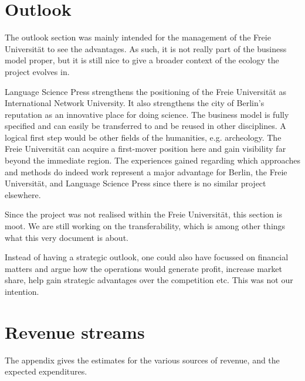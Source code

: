 \documentclass[nonflat,smallfont
]{langsci/langscibook}
\newcommand{\background}[1]{ 
  \vspace{5mm}
  \renewcommand{\tblslinecolour}{lsDarkBlue}
  \tblssy[red]{explore2}{Background}{\vspace*{-5mm}#1}
}
\newcommand{\langscisolution}[1]{
  \renewcommand{\tblslinecolour}{lsLightBlue}
  \tblssy{langsci}{LangSci solution}{\vspace*{-5mm}#1}
}
\newcommand{\evaluation}[1]{
  \renewcommand{\tblslinecolour}{lsLightOrange}
  \tblssy{receipt}{Evaluation}{\vspace*{-5mm}#1}
}
\newcommand{\othersolutions}[1]{
  \renewcommand{\tblslinecolour}{lsDarkGreenOne}
  \tblssy{more}{Other solutions}{\vspace*{-5mm}#1}
}
\renewcommand{\tblssy}[4][black!12]{%
  \renewcommand{\langscisymbol}{#2}\renewcommand{\tblsboxcolor}{#1}
  \begin{mdframed}[style=yellowexercise,frametitle={#3}]
    #4
  \end{mdframed}
}
\begin{document}
\chapter{Outlook}

\background{The outlook section was mainly intended for the management of the Freie Universität to see the advantages. As such, it is not really part of the business model proper, but it is still nice to give a broader context of the ecology the project evolves in.}
\langscisolution{
Language Science Press strengthens the positioning of the Freie Universität as International Network University. It also strengthens the city of Berlin's reputation as an innovative place for doing science. The business model is fully specified and can easily be transferred to and be reused in other disciplines. A logical first step would be other fields of the humanities, e.g. archeology. The Freie Universität can acquire a first-mover position here and gain visibility far beyond the immediate region. The experiences gained regarding which approaches and methods do indeed work represent a major advantage for Berlin, the Freie Universität, and Language Science Press since there is no similar project elsewhere. 
}
\evaluation{Since the project was not realised within the Freie Universität, this section is moot. We are still working on the transferability, which is among other things what this very document is about.}
\othersolutions{
Instead of having a strategic outlook, one could also have focussed on financial matters and argue how the operations would generate profit, increase market share, help gain strategic advantages over the competition etc. This was not our intention. 
}
 

\appendix
\chapter{Revenue streams}
The appendix gives the estimates for the various sources of revenue, and the expected expenditures.
\end{document}

